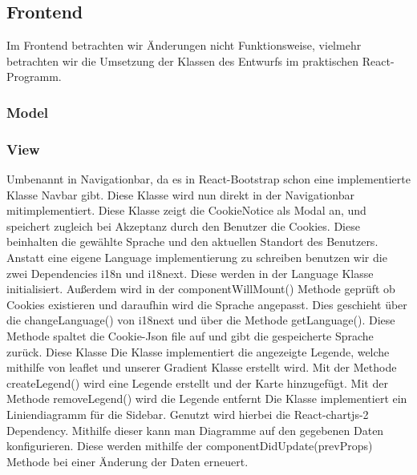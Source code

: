 \subsection{Frontend}
Im Frontend betrachten wir Änderungen nicht Funktionsweise, vielmehr betrachten wir die Umsetzung der Klassen des Entwurfs im praktischen React-Programm.
\subsubsection{Model}

\subsubsection{View}
    Umbenannt in Navigationbar, da es in React-Bootstrap schon eine implementierte Klasse Navbar gibt.
    \removedClass
    Diese Klasse wird nun direkt in der Navigationbar mitimplementiert.
    Diese Klasse zeigt die CookieNotice als Modal an, und speichert zugleich bei Akzeptanz durch den Benutzer die Cookies.
    Diese beinhalten die gewählte Sprache und den aktuellen Standort des Benutzers.
    Anstatt eine eigene Language implementierung zu schreiben benutzen wir die zwei Dependencies i18n und i18next.
    Diese werden in der Language Klasse initialisiert. 
    Außerdem wird in der componentWillMount() Methode geprüft ob Cookies existieren und daraufhin wird die Sprache angepasst. Dies geschieht über die changeLanguage() von i18next und über die Methode getLanguage().
    Diese Methode spaltet die Cookie-Json file auf und gibt die gespeicherte Sprache zurück.
    \removedClass
{}
    Diese Klasse 
    Die Klasse implementiert die angezeigte Legende, welche mithilfe von leaflet und unserer Gradient Klasse erstellt wird.
    \standardMethods
    Mit der Methode createLegend() wird eine Legende erstellt und der Karte hinzugefügt.
    Mit der Methode removeLegend() wird die Legende entfernt
    Die Klasse implementiert ein Liniendiagramm für die Sidebar. Genutzt wird hierbei die React-chartjs-2 Dependency.
    Mithilfe dieser kann man Diagramme auf den gegebenen Daten konfigurieren. Diese werden mithilfe der componentDidUpdate(prevProps) Methode
    bei einer Änderung der Daten erneuert.
    \removedClass
{}
    \removedClass
{}

